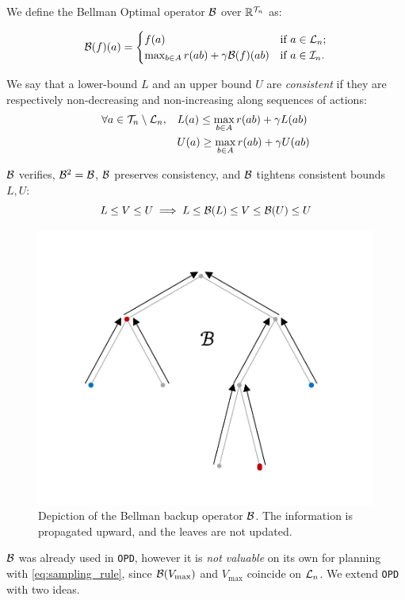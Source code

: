 \documentclass[runningheads]{llncs}
\begin{document}
\begin{definition}
We define the Bellman Optimal operator $\mathcal{B}$ over $\mathbb{R}^{\mathcal{T}_n}$ as:

\begin{equation}
    \mathcal{B}(f)(a) = \begin{cases}
    f(a) & \text{if $a\in\mathcal{L}_n$;} \\
    \max_{b\in A} r(ab) + \gamma \mathcal{B}(f)({ab})
    & \text{if $a\in\mathcal{I}_n$.}
    \end{cases}
\end{equation}
\end{definition}
\begin{definition}
We say that a lower-bound $L$ and an upper bound $U$ are \emph{consistent} if they are respectively non-decreasing and non-increasing along sequences of actions:
\begin{align*}
\forall a\in\mathcal{T}_n\setminus\mathcal{L}_n, \quad &L(a) \leq \max_{b\in A} r(ab) + \gamma L(ab)\\
&U(a) \geq \max_{b\in A} r(ab) + \gamma U(ab)
\end{align*}
\end{definition}

\begin{lemma}
$\mathcal{B}$ verifies, $\mathcal{B}^2=\mathcal{B}$, $\mathcal{B}$ preserves consistency, and $\mathcal{B}$ tightens consistent bounds $L,U$:
\begin{equation*}
    L\leq V \leq U \implies L \leq \mathcal{B}(L) \leq V \leq \mathcal{B}(U) \leq U
\end{equation*}
\end{lemma}

\begin{figure}[H]
	\centering
	\includegraphics[trim={1.8cm 1.4cm 1.9cm 1.9cm}, clip,width=0.4\linewidth]{img/tree_2}
	\caption{Depiction of the Bellman backup operator $\mathcal{B}$. The information is propagated upward, and the leaves are not updated.}
\end{figure}

$\mathcal{B}$ was already used in \texttt{OPD}, however it is \emph{not valuable} on its own for planning with \eqref{eq:sampling_rule}, since  $\mathcal{B}(V_{\max})$ and $V_{\max}$ coincide on $\mathcal{L}_n$.
We extend \texttt{OPD} with two ideas.
\end{document}
